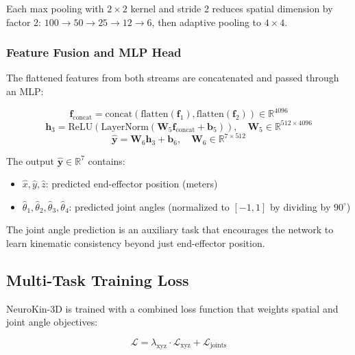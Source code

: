 \documentclass[12pt,a4paper,oneside]{report}
\begin{document}
Each max pooling with $2 \times 2$ kernel and stride 2 reduces spatial dimension by factor 2: $100 \rightarrow 50 \rightarrow 25 \rightarrow 12 \rightarrow 6$, then adaptive pooling to $4 \times 4$.

\subsubsection{Feature Fusion and MLP Head}

The flattened features from both streams are concatenated and passed through an MLP:

\begin{equation}
\mathbf{f}_{\text{concat}} = \text{concat}(\text{flatten}(\mathbf{f}_1), \text{flatten}(\mathbf{f}_2)) \in \mathbb{R}^{4096}
\end{equation}
\begin{equation}
\mathbf{h}_3 = \text{ReLU}(\text{LayerNorm}(\mathbf{W}_5 \mathbf{f}_{\text{concat}} + \mathbf{b}_5)), \quad \mathbf{W}_5 \in \mathbb{R}^{512 \times 4096}
\end{equation}
\begin{equation}
\hat{\mathbf{y}} = \mathbf{W}_6 \mathbf{h}_3 + \mathbf{b}_6, \quad \mathbf{W}_6 \in \mathbb{R}^{7 \times 512}
\end{equation}

The output $\hat{\mathbf{y}} \in \mathbb{R}^7$ contains:
\begin{itemize}
    \item $\hat{x}, \hat{y}, \hat{z}$: predicted end-effector position (meters)
    \item $\hat{\theta}_1, \hat{\theta}_2, \hat{\theta}_3, \hat{\theta}_4$: predicted joint angles (normalized to $[-1, 1]$ by dividing by $90^\circ$)
\end{itemize}

The joint angle prediction is an auxiliary task that encourages the network to learn kinematic consistency beyond just end-effector position.

\subsection{Multi-Task Training Loss}

NeuroKin-3D is trained with a combined loss function that weights spatial and joint angle objectives:

\begin{equation}
\mathcal{L} = \lambda_{\text{xyz}} \cdot \mathcal{L}_{\text{xyz}} + \mathcal{L}_{\text{joints}}
\end{equation}
\end{document}
